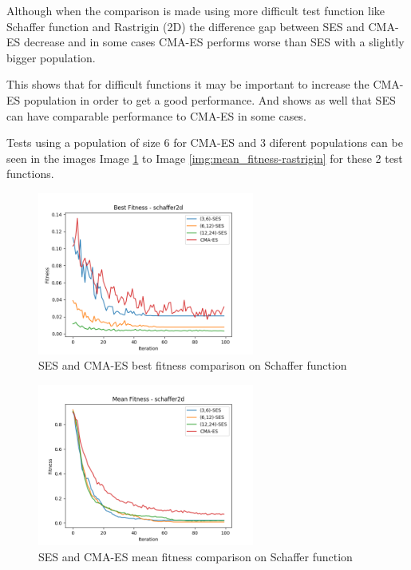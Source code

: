 Although when the comparison is made using more difficult test function like Schaffer function and Rastrigin (2D) the difference gap between SES and CMA-ES decrease and in some cases CMA-ES performs worse than SES with a slightly bigger population.

This shows that for difficult functions it may be important to increase the CMA-ES population in order to get a good performance. And shows as well that SES can have comparable performance to CMA-ES in some cases.

Tests using a population of size 6 for CMA-ES and 3 diferent populations can be seen in the images Image \ref{img:best_fitness-schaffer2d} to Image \ref{img:mean_fitness-rastrigin} for these 2 test functions.

\begin{figure}
  \begin{center}
  \includegraphics[width=2.8in]{./../code/benchmark_results/best_fitness-schaffer2d.png}
  \caption{SES and CMA-ES best fitness comparison on Schaffer function}
  \label{img:best_fitness-schaffer2d}
  \end{center}
\end{figure}

\begin{figure}
  \begin{center}
  \includegraphics[width=2.8in]{./../code/benchmark_results/mean_fitness-schaffer2d.png}
  \caption{SES and CMA-ES mean fitness comparison on Schaffer function}
  \label{img:mean_fitness-schaffer2d}
  \end{center}
\end{figure}

